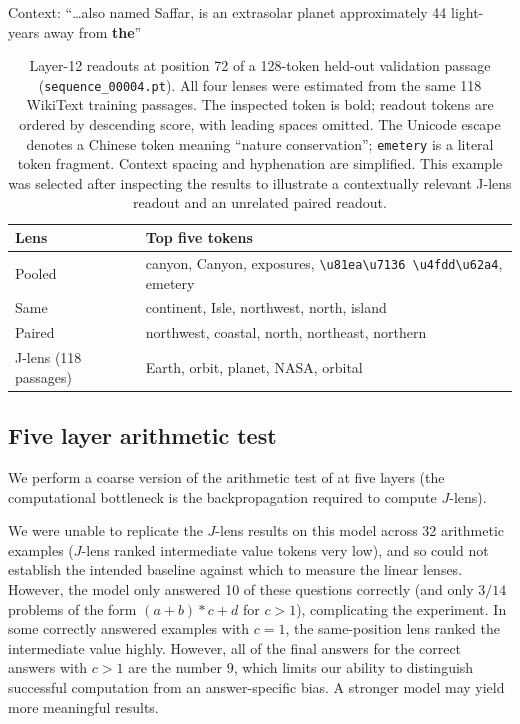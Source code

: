 \documentclass[10pt,oneside,reqno]{amsart}
\theoremstyle{definition}
\numberwithin{equation}{section}
\begin{document}
\begin{table}[H]
\centering
\small

\begin{minipage}{0.95\linewidth}
Context: ``\ldots also named Saffar, is an extrasolar
planet approximately 44 light-years away from \textbf{the}''
\end{minipage}

\medskip
\begin{tabularx}{\linewidth}{lX}
\toprule
Lens & Top five tokens \\
\midrule
Pooled & canyon, Canyon, exposures,
\texttt{\textbackslash u81ea\textbackslash u7136%
\textbackslash u4fdd\textbackslash u62a4}, emetery \\
Same   & continent, Isle, northwest, north, island \\
Paired & northwest, coastal, north, northeast, northern \\
J-lens (118 passages) & Earth, orbit, planet, NASA, orbital \\
\bottomrule
\end{tabularx}

\caption{Layer-12 readouts at position 72 of a 128-token
held-out validation passage (\texttt{sequence\_00004.pt}).
All four lenses were estimated from the same 118 WikiText
training passages. The inspected token is bold; readout tokens
are ordered by descending score, with leading spaces omitted.
The Unicode escape denotes a Chinese token meaning
``nature conservation''; \texttt{emetery} is a literal token
fragment. Context spacing and hyphenation are simplified.
This example was selected after inspecting the results to
illustrate a contextually relevant J-lens readout and an
unrelated paired readout.}
\label{tab:readout-astronomy}
\end{table}

\subsection{Five layer arithmetic test}
We perform a coarse version of the arithmetic test of \cite{gurnee2026jspace} at five layers (the computational bottleneck is the backpropagation required to compute $J$-lens).

We were unable to replicate the $J$-lens results on this model across 32 arithmetic examples ($J$-lens ranked intermediate value tokens very low), and so could not establish the intended baseline against which to measure the linear lenses. However, the model only answered 10 of these questions correctly (and only $3/14$ problems of the form $(a+b)*c+d$ for $c>1$), complicating the experiment. In some correctly answered examples with $c=1$, the same-position lens ranked the intermediate value highly. However, all of the final answers for the correct answers with $c>1$ are the number $9$, which limits our ability to distinguish successful computation from an answer-specific bias. A stronger model may yield more meaningful results.





\end{document}
